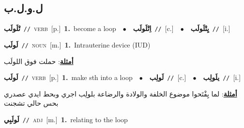 \documentclass[10pt,a4paper,twoside]{article} %
\begin{document}
\begin{multicols}{2}
\vspace{-3mm}
\subsection*{\color{blue}\foreignlanguage{arabic}{ل.و.ل.ب}\color{blue}{}} 

{\setlength\topsep{0pt}\textbf{\foreignlanguage{arabic}{تْلَولَب}}\ {\color{gray}\texttt{//}\color{black}}\ \textsc{verb}\ [p.]\ \textbf{1.}~become a loop\ \ $\bullet$\ \ \setlength\topsep{0pt}\textbf{\foreignlanguage{arabic}{اِتْلَولَب}}\ {\color{gray}\texttt{//}\color{black}}\ [c.]\ \ $\bullet$\ \ \setlength\topsep{0pt}\textbf{\foreignlanguage{arabic}{يِتْلَولَب}}\ {\color{gray}\texttt{//}\color{black}}\ [i.]\ } \vspace{2mm}

{\setlength\topsep{0pt}\textbf{\foreignlanguage{arabic}{لَولَب}}\ {\color{gray}\texttt{//}\color{black}}\ \textsc{noun}\ [m.]\ \textbf{1.}~Intrauterine device (IUD)\  \begin{flushright}\color{gray}\foreignlanguage{arabic}{\textbf{\underline{\foreignlanguage{arabic}{أمثلة}}}: حملت فوق اللولَب}\end{flushright}\color{black}} \vspace{2mm}

{\setlength\topsep{0pt}\textbf{\foreignlanguage{arabic}{لَولَب}}\ {\color{gray}\texttt{//}\color{black}}\ \textsc{verb}\ [p.]\ \textbf{1.}~make sth into a loop\ \ $\bullet$\ \ \setlength\topsep{0pt}\textbf{\foreignlanguage{arabic}{لَولِب}}\ {\color{gray}\texttt{//}\color{black}}\ [c.]\ \ $\bullet$\ \ \setlength\topsep{0pt}\textbf{\foreignlanguage{arabic}{يلَولِب}}\ {\color{gray}\texttt{//}\color{black}}\ [i.]\  \begin{flushright}\color{gray}\foreignlanguage{arabic}{\textbf{\underline{\foreignlanguage{arabic}{أمثلة}}}: لما يِفْتَحوا موضوع الخلفة والولادة والرضاعة بلولِب اجري وبحط ايدي عصدري بحس حالي تشجنت}\end{flushright}\color{black}} \vspace{2mm}

{\setlength\topsep{0pt}\textbf{\foreignlanguage{arabic}{لَولَبِي}}\ {\color{gray}\texttt{//}\color{black}}\ \textsc{adj}\ [m.]\ \textbf{1.}~relating to the loop\ } \vspace{2mm}


\end{multicols}
\end{document}
